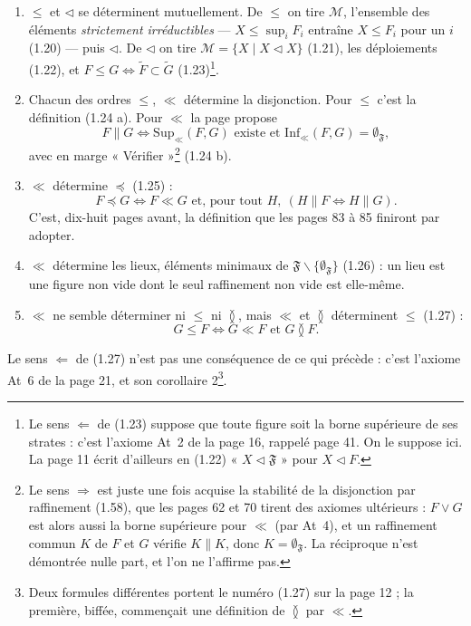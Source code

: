 \documentclass[11pt,a4paper]{article}
\begin{document}
\begin{enumerate}
\item[a)] $\leq$ et $\triangleleft$ se déterminent mutuellement. De $\leq$ on tire
$\mathcal{M}$, l'ensemble des éléments \emph{strictement irréductibles} --- $X
\leq \sup_{i} F_{i}$ entraîne $X \leq F_{i}$ pour un $i$ (1.20) --- puis
$\triangleleft$. De $\triangleleft$ on tire $\mathcal{M} = \lbrace X \mid X
\mathrel{\triangleleft} X \rbrace$ (1.21), les déploiements (1.22), et $F \leq G
\iff \widetilde{F} \subset \widetilde{G}$ (1.23)\footnote{Le sens $\Leftarrow$ de
(1.23) suppose que toute figure soit la borne supérieure de ses strates : c'est
l'axiome At~2 de la page 16, rappelé page 41. On le suppose ici. La page 11
écrit d'ailleurs en (1.22) « $X \mathrel{\triangleleft} \mathfrak{F}$ » pour $X
\mathrel{\triangleleft} F$.}.
\item[b)] Chacun des ordres $\leq$, $\ll$ détermine la disjonction. Pour $\leq$
c'est la définition (1.24 a). Pour $\ll$ la page propose
\[
F \parallel G \iff \mathrm{Sup}_{\ll}(F,G) \text{ existe et }
\mathrm{Inf}_{\ll}(F,G) = \emptyset_{\mathfrak{F}} ,
\]
avec en marge « Vérifier »\footnote{Le sens $\Rightarrow$ est juste une fois
acquise la stabilité de la disjonction par raffinement (1.58), que les pages
62 et 70 tirent des axiomes ultérieurs : $F \vee G$ est alors aussi la borne
supérieure pour $\ll$ (par At~4), et un raffinement commun $K$ de $F$ et $G$
vérifie $K \parallel K$, donc $K = \emptyset_{\mathfrak{F}}$. La réciproque
n'est démontrée nulle part, et l'on ne l'affirme pas.} (1.24 b).
\item[c)] $\ll$ détermine $\preccurlyeq$ (1.25) :
\[
F \preccurlyeq G \iff F \ll G \text{ et, pour tout } H, \ (H \parallel F \iff H
\parallel G) .
\]
C'est, dix-huit pages avant, la définition que les pages 83 à 85 finiront par
adopter.
\item[d)] $\ll$ détermine les lieux, éléments minimaux de $\mathfrak{F}
\smallsetminus \lbrace \emptyset_{\mathfrak{F}} \rbrace$ (1.26) : un lieu est une
figure non vide dont le seul raffinement non vide est elle-même.
\item[e)] $\ll$ ne semble déterminer ni $\leq$ ni $\between$, mais $\ll$ et
$\between$ déterminent $\leq$ (1.27) :
\[
G \leq F \iff G \ll F \text{ et } G \between F .
\]
\end{enumerate}
Le sens $\Leftarrow$ de (1.27) n'est pas une conséquence de ce qui précède :
c'est l'axiome At~6 de la page 21, et son corollaire 2\footnote{Deux formules
différentes portent le numéro (1.27) sur la page 12 ; la première, biffée,
commençait une définition de $\between$ par $\ll$.}.
\end{document}
